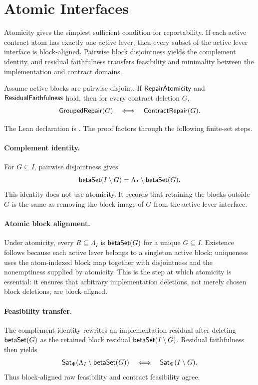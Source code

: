 \section{Atomic Interfaces}
\label{sec:atomic}

Atomicity gives the simplest sufficient condition for reportability.  If each
active contract atom has exactly one active lever, then every subset of the
active lever interface is block-aligned.  Pairwise block disjointness yields
the complement identity, and residual faithfulness transfers feasibility and
minimality between the implementation and contract domains.

\begin{theorem}
\label{thm:m3a}
Assume active blocks are pairwise disjoint.  If \(\mathsf{RepairAtomicity}\) and
\(\mathsf{ResidualFaithfulness}\) hold, then for every contract deletion \(G\),
\[
  \mathsf{GroupedRepair}(G)
  \quad\Longleftrightarrow\quad
  \mathsf{ContractRepair}(G).
\]
\end{theorem}

The Lean declaration is .  The proof factors
through the following finite-set steps.

\paragraph{Complement identity.}
For \(G\subseteq I\), pairwise disjointness gives
\[
  \mathsf{betaSet}(I\setminus G)
  =
  \Lambda_I\setminus\mathsf{betaSet}(G).
\]
This identity does not use atomicity.  It records that retaining the blocks
outside \(G\) is the same as removing the block image of \(G\) from the active
lever interface.

\paragraph{Atomic block alignment.}
Under atomicity, every \(R\subseteq\Lambda_I\) is
\(\mathsf{betaSet}(G)\) for a unique \(G\subseteq I\).  Existence follows because each
active lever belongs to a singleton active block; uniqueness uses the
atom-indexed block map together with disjointness and the nonemptiness supplied
by atomicity.  This is the step at which atomicity is essential: it ensures
that arbitrary implementation deletions, not merely chosen block deletions,
are block-aligned.

\paragraph{Feasibility transfer.}
The complement identity rewrites an implementation residual after deleting
\(\mathsf{betaSet}(G)\) as the retained block residual
\(\mathsf{betaSet}(I\setminus G)\).  Residual faithfulness then yields
\[
  \mathsf{Sat}_{\Phi}(\Lambda_I\setminus\mathsf{betaSet}(G))
  \quad\Longleftrightarrow\quad
  \mathsf{Sat}_{\Psi}(I\setminus G).
\]
Thus block-aligned raw feasibility and contract feasibility agree.

